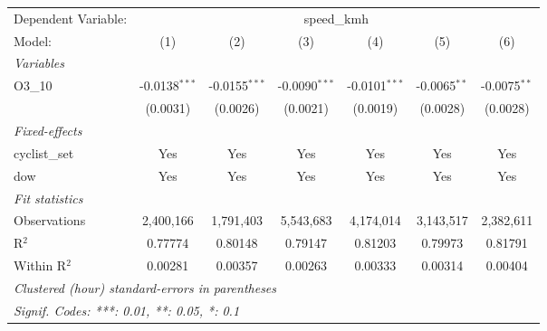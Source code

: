 \begingroup
\centering
\begin{tabular}{lcccccc}
   \tabularnewline \midrule \midrule
   Dependent Variable: & \multicolumn{6}{c}{speed\_kmh}\\
   Model:        & (1)             & (2)             & (3)             & (4)             & (5)            & (6)\\  
   \midrule
   \emph{Variables}\\
   O3\_10        & -0.0138$^{***}$ & -0.0155$^{***}$ & -0.0090$^{***}$ & -0.0101$^{***}$ & -0.0065$^{**}$ & -0.0075$^{**}$\\   
                 & (0.0031)        & (0.0026)        & (0.0021)        & (0.0019)        & (0.0028)       & (0.0028)\\   
   \midrule
   \emph{Fixed-effects}\\
   cyclist\_set  & Yes             & Yes             & Yes             & Yes             & Yes            & Yes\\  
   dow           & Yes             & Yes             & Yes             & Yes             & Yes            & Yes\\  
   \midrule
   \emph{Fit statistics}\\
   Observations  & 2,400,166       & 1,791,403       & 5,543,683       & 4,174,014       & 3,143,517      & 2,382,611\\  
   R$^2$         & 0.77774         & 0.80148         & 0.79147         & 0.81203         & 0.79973        & 0.81791\\  
   Within R$^2$  & 0.00281         & 0.00357         & 0.00263         & 0.00333         & 0.00314        & 0.00404\\  
   \midrule \midrule
   \multicolumn{7}{l}{\emph{Clustered (hour) standard-errors in parentheses}}\\
   \multicolumn{7}{l}{\emph{Signif. Codes: ***: 0.01, **: 0.05, *: 0.1}}\\
\end{tabular}
\par\endgroup

